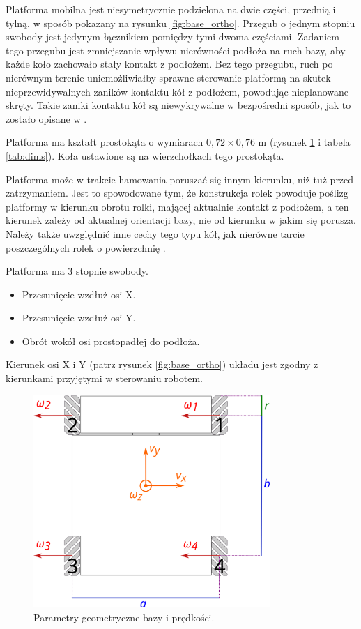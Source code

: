 	Platforma mobilna jest niesymetrycznie podzielona na dwie części, przednią i tylną, w sposób pokazany na rysunku \ref{fig:base_ortho}.
	Przegub o jednym stopniu swobody jest jedynym łącznikiem pomiędzy tymi dwoma częściami.
	Zadaniem tego przegubu jest zmniejszanie wpływu nierówności podłoża na ruch bazy, aby każde koło zachowało stały kontakt z podłożem.
	Bez tego przegubu, ruch po nierównym terenie uniemożliwiałby sprawne sterowanie platformą na skutek nieprzewidywalnych zaników kontaktu kół z podłożem, powodując nieplanowane skręty.
	Takie zaniki kontaktu kół są niewykrywalne w bezpośredni sposób, jak to zostało opisane w \cite{boringbot}.

	Platforma ma kształt prostokąta o wymiarach $0,72\times0,76$ \si{\metre} (rysunek \ref{fig:base_dims} i tabela \ref{tab:dims}).
	Koła ustawione są na wierzchołkach tego prostokąta.

	Platforma może w trakcie hamowania poruszać się innym kierunku, niż tuż przed zatrzymaniem.
	Jest to spowodowane tym, że konstrukcja rolek powoduje poślizg platformy w kierunku obrotu rolki, mającej aktualnie kontakt z podłożem, a ten kierunek zależy od aktualnej
	orientacji bazy, nie od kierunku w jakim się porusza.
	Należy także uwzględnić inne cechy tego typu kół, jak nierówne tarcie poszczególnych rolek o powierzchnię \cite{braking}.

	Platforma ma 3 stopnie swobody. 
	\begin{itemize}
		\item Przesunięcie wzdłuż osi X.
		\item Przesunięcie wzdłuż osi Y.
		\item Obrót wokół osi prostopadłej do podłoża.
	\end{itemize}
	
	Kierunek osi X i Y (patrz rysunek \ref{fig:base_ortho}) układu jest zgodny z kierunkami przyjętymi w sterowaniu robotem.
	
	\begin{figure}[h]
		\centering
		\includegraphics[width=0.8\textwidth]{graphics/base_dims.pdf}
		\caption{Parametry geometryczne bazy i prędkości.}
		\label{fig:base_dims}
	\end{figure} 

